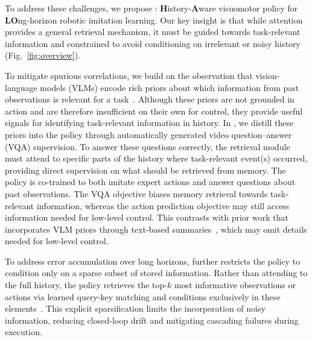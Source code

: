 To address these challenges, we propose \ourmethod{}: \textbf{H}istory-\textbf{A}ware visuomotor policy for \textbf{LO}ng-horizon robotic imitation learning.
Our key insight is that while attention provides a general retrieval mechanism, it must be guided towards task-relevant information and constrained to avoid conditioning on irrelevant or noisy history (Fig.~\ref{fig:overview}).


To mitigate spurious correlations, we build on the observation that vision-language models (VLMs) encode rich priors about which information from past observations is relevant for a task~\cite{bubeck2023sparks}.
Although these priors are not grounded in action and are therefore insufficient on their own for control, they provide useful signals for identifying task-relevant information in history.
In \ourmethod{}, we distill these priors into the policy through automatically generated video question–answer (VQA) supervision.
To answer these questions correctly, the retrieval module must attend to specific parts of the history where task-relevant event(s) occurred, providing direct supervision on what should be retrieved from memory.
The policy is co-trained to both imitate expert actions and answer questions about past observations. The VQA objective biases memory retrieval towards task-relevant information, whereas the action prediction objective may still access information needed for low-level control.
This contrasts with prior work that incorporates VLM priors through text-based summaries~\cite{anwar2025remembr}, which may omit details needed for low-level control.

To address error accumulation over long horizons, \ourmethod{} further restricts the policy to condition only on a sparse subset of stored information.
Rather than attending to the full history, the policy retrieves the top-$k$ most informative observations or actions via learned query-key matching and conditions exclusively in these elements~\cite{child2019generating}. 
This explicit sparsification limits the incorporation of noisy information, reducing closed-loop drift and mitigating cascading failures during execution.

